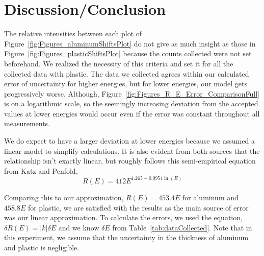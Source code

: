 \section{Discussion/Conclusion}

\label{sec:discussion_conclusion} The relative intensities between each plot of Figure~\ref{fig:Figures_aluminumShiftsPlot} do not give as much insight as those in Figure~\ref{fig:Figures_plasticShiftsPlot} because the counts collected were not set beforehand. We realized the necessity of this criteria and set it for all the collected data with plastic. The data we collected agrees within our calculated error of uncertainty for higher energies, but for lower energies, our model gets progressively worse. Although, Figure~\ref{fig:Figures_R_E_Error_ComparisonFull} is on a logarithmic scale, so the seemingly increasing deviation from the accepted values at lower energies would occur even if the error was constant throughout all measurements. 

We do expect to have a larger deviation at lower energies because we assumed a linear model to simplify calculations. It is also evident from both sources that the relationship isn't exactly linear, but roughly follows this semi-empirical equation from Katz and Penfold,\cite{RevModPhys.24.28} 
\begin{equation}
	R(E) = 412 E^{1.265 - 0.0954 \ln(E)} \label{eq:acceptedEq} 
\end{equation}

Comparing this to our approximation, $R(E) = 453.4 E$ for aluminum and $458.8 E$ for plastic, we are satisfied with the results as the main source of error was our linear approximation. To calculate the errors, we used the equation,\cite{093570275X} $\delta R(E) = |k| \delta E$ and we know $\delta E$ from Table~\ref{tab:dataCollected}. Note that in this experiment, we assume that the uncertainty in the thickness of aluminum and plastic is negligible.

